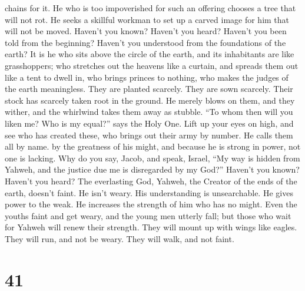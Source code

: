 chains for it.  He who is too impoverished for such an
offering chooses a tree that will not rot. He seeks a skillful workman
to set up a carved image for him that will not be moved. 
Haven't you known? Haven't you heard? Haven't you been told from the
beginning? Haven't you understood from the foundations of the earth?
 It is he who sits above the circle of the earth, and its
inhabitants are like grasshoppers; who stretches out the heavens like a
curtain, and spreads them out like a tent to dwell in,  who
brings princes to nothing, who makes the judges of the earth
meaningless.  They are planted scarcely. They are sown
scarcely. Their stock has scarcely taken root in the ground. He merely
blows on them, and they wither, and the whirlwind takes them away as
stubble.  ``To whom then will you liken me? Who is my
equal?'' says the Holy One.  Lift up your eyes on high, and
see who has created these, who brings out their army by number. He calls
them all by name. by the greatness of his might, and because he is
strong in power, not one is lacking.  Why do you say,
Jacob, and speak, Israel, ``My way is hidden from Yahweh, and the
justice due me is disregarded by my God?''  Haven't you
known? Haven't you heard? The everlasting God, Yahweh, the Creator of
the ends of the earth, doesn't faint. He isn't weary. His understanding
is unsearchable.  He gives power to the weak. He increases
the strength of him who has no might.  Even the youths
faint and get weary, and the young men utterly fall;  but
those who wait for Yahweh will renew their strength. They will mount up
with wings like eagles. They will run, and not be weary. They will walk,
and not faint.

\hypertarget{section-39}{%
\section{41}\label{section-39}}

